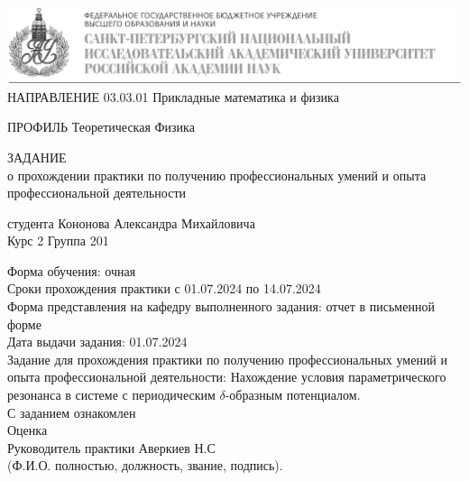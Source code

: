 \documentclass[11pt]{article}    %
\begin{document}
\begin{titlepage}
    \includegraphics[scale = 0.43]{alf4.JPG}
    \\

НАПРАВЛЕНИЕ 03.03.01 Прикладные математика и физика
\par ПРОФИЛЬ Теоретическая Физика\\

\begin{center}
\begin{bf}
     ЗАДАНИЕ\\ 
     о прохождении практики по получению профессиональных умений и опыта профессиональной деятельности 
\end{bf}
  


студента Кононова Александра Михайловича \\

Курс 2 Группа 201
\end{center}

Форма обучения: очная \\
Сроки прохождения практики с 01.07.2024 по 14.07.2024 \\
Форма представления на кафедру выполненного задания: 
отчет в письменной форме\\
Дата выдачи задания: 01.07.2024\\
Задание для прохождения практики по получению профессиональных умений и опыта профессиональной деятельности: Нахождение условия параметрического резонанса в системе с периодическим $\delta$-образным потенциалом. \\
С заданием ознакомлен \\
 
Оценка \\
Руководитель практики Аверкиев Н.С\\
(Ф.И.О. полностью, должность, звание, подпись).

\end{titlepage}
\end{document}

